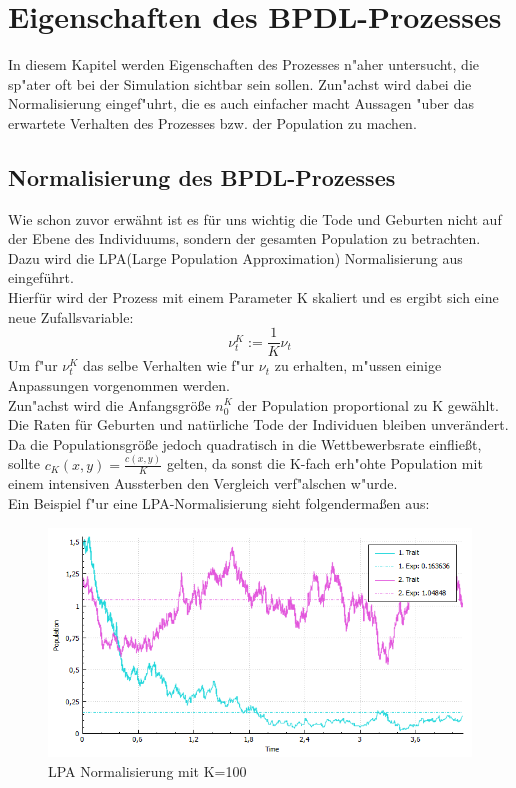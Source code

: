 \documentclass[11pt, a4paper, german]{article}
\theoremstyle{plain}
\begin{document}
\clearpage
\section{Eigenschaften des BPDL-Prozesses}
In diesem Kapitel werden Eigenschaften des Prozesses n"aher untersucht, die sp"ater oft bei der Simulation sichtbar sein sollen. Zun"achst wird dabei die Normalisierung eingef"uhrt, die es auch einfacher macht Aussagen "uber das erwartete Verhalten des Prozesses bzw. der Population zu machen. 

	\subsection{Normalisierung des BPDL-Prozesses}
	Wie schon zuvor erwähnt ist es für uns wichtig die Tode und Geburten nicht auf der Ebene des Individuums, sondern der gesamten Population zu betrachten. Dazu wird die LPA(Large Population Approximation) Normalisierung aus \cite{fournier2004microscopic} eingeführt.\\
	Hierfür wird der Prozess mit einem Parameter K skaliert und es ergibt sich eine neue Zufallsvariable:
	\[ \nu_t^K := \frac{1}{K} \nu_t \]
	Um f"ur $ \nu_t^K $ das selbe Verhalten wie f"ur $ \nu_t $ zu erhalten, m"ussen einige Anpassungen vorgenommen werden.\\
	Zun"achst wird die Anfangsgröße $ n_0^K $ der Population proportional zu K gewählt.
	Die Raten für Geburten und natürliche Tode der Individuen bleiben unverändert. Da die Populationsgröße jedoch quadratisch in die Wettbewerbsrate einfließt, sollte $ c_K(x,y) = \frac{c(x,y)}{K} $ gelten, da sonst die K-fach erh"ohte Population mit einem intensiven Aussterben den Vergleich verf"alschen w"urde. \\
	Ein Beispiel f"ur eine LPA-Normalisierung sieht folgendermaßen aus:
	\begin{figure}[H]
		\centering
		\includegraphics[width=1\linewidth]{./Pictures/LPANormalisierungK100}
		\caption[LPAK100]{LPA Normalisierung mit K=100}
		\label{LPA Normalisierung K=100}
	\end{figure}
\end{document}
